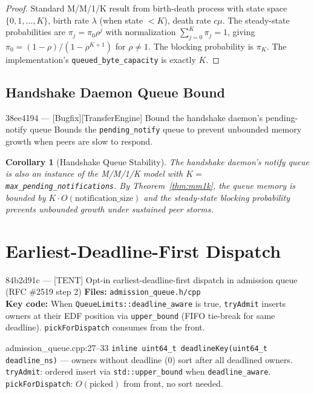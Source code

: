 \documentclass[11pt,a4paper,twoside]{article}
\theoremstyle{plain}
\newtheorem{corollary}[theorem]{Corollary}
\theoremstyle{definition}
\theoremstyle{remark}
\begin{document}
\begin{proof}
Standard M/M/1/K result from birth-death process with state space $\{0,1,\ldots,K\}$,
birth rate $\lambda$ (when state $< K$), death rate $c\mu$.  The steady-state probabilities
are $\pi_j = \pi_0 \rho^j$ with normalization $\sum_{j=0}^K \pi_j = 1$, giving
$\pi_0 = (1-\rho)/(1-\rho^{K+1})$ for $\rho \neq 1$.  The blocking probability is $\pi_K$.
The implementation's \texttt{queued\_byte\_capacity} is exactly $K$.
\end{proof}


\subsection{Handshake Daemon Queue Bound}

\begin{commitbox}{38ee4194 --- [Bugfix][TransferEngine] Bound the handshake daemon's
pending-notify queue}
Bounds the \texttt{pending\_notify} queue to prevent unbounded memory growth when peers
are slow to respond.
\end{commitbox}

\begin{corollary}[Handshake Queue Stability]
\label{cor:handshake-bound}
The handshake daemon's notify queue is also an instance of the M/M/1/K model with
$K = $ \texttt{max\_pending\_notifications}. By Theorem~\ref{thm:mm1k}, the queue
memory is bounded by $K \cdot O(\text{notification\_size})$ and the steady-state
blocking probability prevents unbounded growth under sustained peer storms.
\end{corollary}


\section{Earliest-Deadline-First Dispatch}
\label{sec:edf}

\begin{commitbox}{84b2d91c --- [TENT] Opt-in earliest-deadline-first dispatch in admission
queue (RFC \#2519 step 2)}
\textbf{Files:} \texttt{admission\_queue.h/cpp}\\
\textbf{Key code:} When \texttt{QueueLimits::deadline\_aware} is true,
\texttt{tryAdmit} inserts owners at their EDF position via \texttt{upper\_bound}
(FIFO tie-break for same deadline). \texttt{pickForDispatch} consumes from the front.
\end{commitbox}

\begin{codeline}{admission\_queue.cpp:27--33}
\texttt{inline uint64\_t deadlineKey(uint64\_t deadline\_ns)} ---
owners without deadline ($0$) sort after all deadlined owners.\\
\texttt{tryAdmit}: ordered insert via \texttt{std::upper\_bound} when \texttt{deadline\_aware}.\\
\texttt{pickForDispatch}: $O(\text{picked})$ from front, no sort needed.
\end{codeline}
\end{document}
